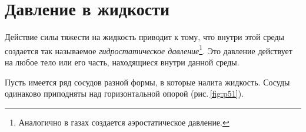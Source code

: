 \documentclass[main.tex]{subfiles}
\begin{document}

 

 

 
   

\section{Давление в жидкости}

Действие силы тяжести на жидкость приводит к тому, что внутри этой среды создается так называемое \emph{гидростатическое давление}\footnote{Аналогично в газах создается аэростатическое давление.}. Это давление действует на любое тело или его часть, находящиеся внутри данной среды.

Пусть имеется ряд сосудов разной формы, в которые налита жидкость. Сосуды одинаково приподняты над горизонтальной опорой (рис.\,\ref{fig:p51}).
\end{document}
